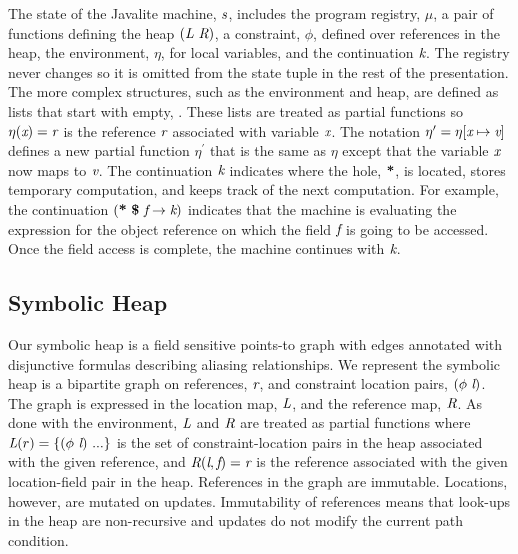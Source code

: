 The state of the Javalite machine,
$\emph{s}$, includes the program registry, $\mu$, a pair of functions defining the heap
$(\emph{L}\ \emph{R})$, a constraint,
$\phi$, defined over references in the heap, the environment, $\eta$,
for local variables, and the continuation $\emph{k}$. The registry never changes so it is omitted from the state tuple in the rest of the presentation.  The more
complex structures, such as the environment and heap, are defined as lists that
start with empty, . These lists are treated as partial functions so
$\eta(\emph{x}) = \emph{r}$ is the reference $\emph{r}$ associated with variable
$\emph{x}$. The notation $\eta^\prime = \eta[\emph{x} \mapsto
  \emph{v}]$ defines a new partial function $\eta^\prime$ that is
the same as $\eta$ except that the variable $\emph{x}$ now maps to
$\emph{v}$. The continuation $\emph{k}$ indicates where the hole, $\textbf{*}$, is located, stores temporary computation, and keeps track of the next 
computation. For example, the continuation
$\lp\cfgt{*}\ \cfgt{\$}\ \cfgnt{f} \rightarrow \cfgnt{k}\rp$ indicates
that the machine is evaluating the expression for the object
reference on which the field $\emph{f}$ is going to be accessed. Once
the field access is complete, the machine continues with $\emph{k}$.

\subsection{Symbolic Heap}

Our symbolic heap is a field sensitive points-to graph with edges
annotated with disjunctive formulas describing aliasing
relationships. We represent the symbolic heap is a bipartite graph on
references, $\emph{r}$, and constraint location pairs,
$(\phi\ \emph{l})$. The graph is expressed in the location map,
$\emph{L}$, and the reference map, $\emph{R}$. As done with the
environment, $\emph{L}$ and $\emph{R}$ are treated as partial
functions where $\cfgnt{L}(r) = \{(\phi\ \cfgnt{l})\ ...\}$ is the set
of constraint-location pairs in the heap associated with the given
reference, and $\emph{R}(\emph{l},\emph{f}) = \emph{r}$ is the
reference associated with the given location-field pair in the
heap. References in the graph are immutable. Locations, however, are
mutated on updates.  Immutability of references means that look-ups in
the heap are non-recursive and updates do not modify the current path
condition.

